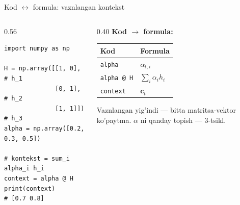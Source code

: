 \documentclass[aspectratio=169,11pt]{beamer}
\begin{document}
\begin{frame}[fragile]{Kod $\leftrightarrow$ formula: vaznlangan kontekst}
  \begin{columns}[T]
    \begin{column}{0.56\textwidth}
\begin{lstlisting}
import numpy as np

H = np.array([[1, 0],     # h_1
              [0, 1],     # h_2
              [1, 1]])    # h_3
alpha = np.array([0.2, 0.3, 0.5])

# kontekst = sum_i alpha_i h_i
context = alpha @ H
print(context)            # [0.7 0.8]
\end{lstlisting}
    \end{column}
    \begin{column}{0.40\textwidth}
      \textbf{Kod $\to$ formula:}\\[3pt]
      \footnotesize
      \begin{tabular}{p{1.9cm}p{2.1cm}}
        \toprule
        Kod & Formula \\
        \midrule
        \texttt{alpha} & $\alpha_{t,i}$ \\
        \texttt{alpha @ H} & $\sum_i \alpha_i h_i$ \\
        \texttt{context} & $\mathbf{c}_t$ \\
        \bottomrule
      \end{tabular}
      \vspace{4pt}
      \begin{tcolorbox}[okbox,top=2pt,bottom=2pt]
        \footnotesize
        Vaznlangan yig'indi --- bitta matritsa-vektor ko'paytma. $\alpha$ ni
        qanday topish --- 3-tsikl.
      \end{tcolorbox}
    \end{column}
  \end{columns}
\end{frame}
\end{document}

